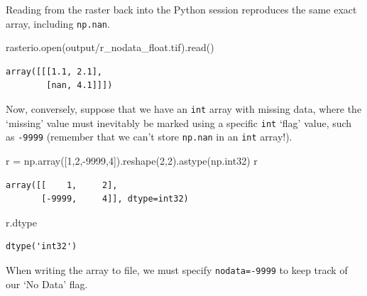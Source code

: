 \documentclass[
  letterpaper,
]{krantz}
\newenvironment{Shaded}{\begin{snugshade}}{\end{snugshade}}
\newcommand{\BuiltInTok}[1]{\textcolor[rgb]{0.00,0.23,0.31}{#1}}
\newcommand{\DecValTok}[1]{\textcolor[rgb]{0.68,0.00,0.00}{#1}}
\newcommand{\NormalTok}[1]{\textcolor[rgb]{0.00,0.23,0.31}{#1}}
\newcommand{\OperatorTok}[1]{\textcolor[rgb]{0.37,0.37,0.37}{#1}}
\newcommand{\StringTok}[1]{\textcolor[rgb]{0.13,0.47,0.30}{#1}}
\begin{document}
Reading from the raster back into the Python session reproduces the same
exact array, including \texttt{np.nan}.

\begin{Shaded}
\begin{Highlighting}[]
\NormalTok{rasterio.}\BuiltInTok{open}\NormalTok{(}\StringTok{\textquotesingle{}output/r\_nodata\_float.tif\textquotesingle{}}\NormalTok{).read()}
\end{Highlighting}
\end{Shaded}

\begin{verbatim}
array([[[1.1, 2.1],
        [nan, 4.1]]])
\end{verbatim}

Now, conversely, suppose that we have an \texttt{int} array with missing
data, where the `missing' value must inevitably be marked using a
specific \texttt{int} `flag' value, such as \texttt{-9999} (remember
that we can't store \texttt{np.nan} in an \texttt{int} array!).

\begin{Shaded}
\begin{Highlighting}[]
\NormalTok{r }\OperatorTok{=}\NormalTok{ np.array([}\DecValTok{1}\NormalTok{,}\DecValTok{2}\NormalTok{,}\OperatorTok{{-}}\DecValTok{9999}\NormalTok{,}\DecValTok{4}\NormalTok{]).reshape(}\DecValTok{2}\NormalTok{,}\DecValTok{2}\NormalTok{).astype(np.int32)}
\NormalTok{r}
\end{Highlighting}
\end{Shaded}

\begin{verbatim}
array([[    1,     2],
       [-9999,     4]], dtype=int32)
\end{verbatim}

\begin{Shaded}
\begin{Highlighting}[]
\NormalTok{r.dtype}
\end{Highlighting}
\end{Shaded}

\begin{verbatim}
dtype('int32')
\end{verbatim}

When writing the array to file, we must specify \texttt{nodata=-9999} to
keep track of our `No Data' flag.
\end{document}
